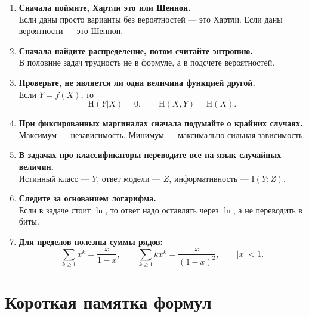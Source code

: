 \documentclass[12pt,a4paper]{article}
\renewcommand{\ge}{\geqslant}
\newcommand{\HH}{\mathrm{H}}
\newcommand{\II}{\mathrm{I}}
\begin{document}
\begin{tcolorbox}[colback=yellow!5, colframe=orange!80!black, title=\textbf{7 золотых правил}, fonttitle=\bfseries]
\begin{enumerate}[leftmargin=1.7em,label=\textbf{\arabic*.}]
    \item \textbf{Сначала поймите, Хартли это или Шеннон.}\\
    Если даны просто варианты без вероятностей --- это Хартли. Если даны вероятности --- это Шеннон.

    \item \textbf{Сначала найдите распределение, потом считайте энтропию.}\\
    В половине задач трудность не в формуле, а в подсчете вероятностей.

    \item \textbf{Проверьте, не является ли одна величина функцией другой.}\\
    Если $Y=f(X)$, то
    $$
    \HH(Y|X)=0,\qquad \HH(X,Y)=\HH(X).
    $$

    \item \textbf{При фиксированных маргиналах сначала подумайте о крайних случаях.}\\
    Максимум --- независимость. Минимум --- максимально сильная зависимость.

    \item \textbf{В задачах про классификаторы переводите все на язык случайных величин.}\\
    Истинный класс --- $Y$, ответ модели --- $Z$, информативность --- $\II(Y:Z)$.

    \item \textbf{Следите за основанием логарифма.}\\
    Если в задаче стоит $\ln$, то ответ надо оставлять через $\ln$, а не переводить в биты.

    \item \textbf{Для пределов полезны суммы рядов:}
    $$
    \sum_{k\ge 1} x^k=\frac{x}{1-x},
    \qquad
    \sum_{k\ge 1} kx^k=\frac{x}{(1-x)^2},
    \qquad |x|<1.
    $$
\end{enumerate}
\end{tcolorbox}

\section{Короткая памятка формул}
\end{document}
